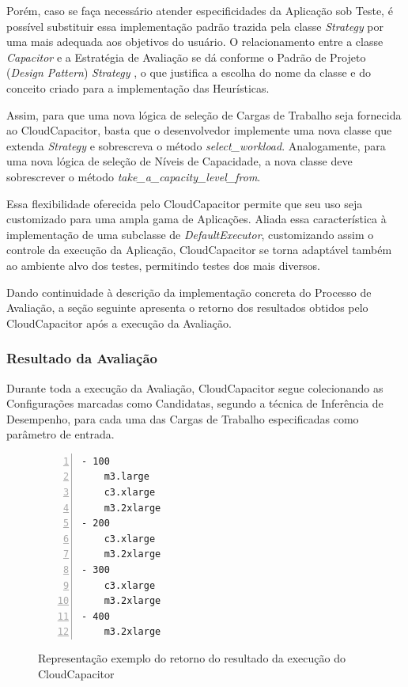 Porém, caso se faça necessário atender especificidades da Aplicação sob Teste, 
é possível substituir essa implementação padrão trazida pela classe \emph{Strategy} 
por uma mais adequada aos objetivos do usuário. O relacionamento entre a classe 
\emph{Capacitor} e a Estratégia de Avaliação se dá conforme o Padrão de Projeto 
(\emph{Design Pattern}) \emph{Strategy} \cite{gamma}, o que justifica a escolha 
do nome da classe e do conceito criado para a implementação das Heurísticas.

Assim, para que uma nova lógica de seleção de Cargas de Trabalho seja fornecida
ao CloudCapacitor, basta que o desenvolvedor implemente uma nova classe que extenda
\emph{Strategy} e sobrescreva o método \emph{select\_workload}. Analogamente,
para uma nova lógica de seleção de Níveis de Capacidade, a nova classe deve 
sobrescrever o método \emph{take\_a\_capacity\_level\_from}.

Essa flexibilidade oferecida pelo CloudCapacitor permite que seu uso seja 
customizado para uma ampla gama de Aplicações. Aliada essa característica à 
implementação de uma subclasse de \emph{DefaultExecutor}, customizando assim o 
controle da execução da Aplicação, CloudCapacitor se torna adaptável também ao
ambiente alvo dos testes, permitindo testes dos mais diversos.

Dando continuidade à descrição da implementação concreta do Processo de Avaliação,
a seção seguinte apresenta o retorno dos resultados obtidos pelo CloudCapacitor
após a execução da Avaliação.

\subsubsection{Resultado da Avaliação}
\label{subsubsec:funcionamento_resultado}
Durante toda a execução da Avaliação, CloudCapacitor segue colecionando as
Configurações marcadas como Candidatas, segundo a técnica de Inferência de 
Desempenho, para cada uma das Cargas de Trabalho especificadas como parâmetro de 
entrada.

\begin{figure}[h]
  \caption{\label{fig:resultado}Representação exemplo do retorno do resultado da execução do CloudCapacitor}
 \begin{lstlisting}[linewidth=\textwidth,xleftmargin=.04\textwidth, numbers=left]
- 100
    m3.large
    c3.xlarge
    m3.2xlarge
- 200
    c3.xlarge
    m3.2xlarge
- 300
    c3.xlarge
    m3.2xlarge
- 400
    m3.2xlarge
  \end{lstlisting}
\end{figure}

